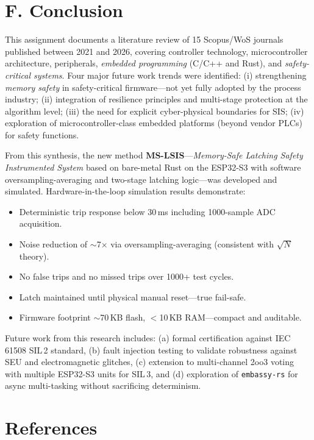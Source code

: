 \documentclass[11pt,a4paper]{article}
\begin{document}
\clearpage

\section{F. Conclusion}

This assignment documents a literature review of 15 Scopus/WoS journals published between 2021 and 2026, covering controller technology, microcontroller architecture, peripherals, \textit{embedded programming} (C/C++ and Rust), and \textit{safety-critical systems}. Four major future work trends were identified: (i) strengthening \textit{memory safety} in safety-critical firmware---not yet fully adopted by the process industry; (ii) integration of resilience principles and multi-stage protection at the algorithm level; (iii) the need for explicit cyber-physical boundaries for SIS; (iv) exploration of microcontroller-class embedded platforms (beyond vendor PLCs) for safety functions.

From this synthesis, the new method \textbf{MS-LSIS}---\textit{Memory-Safe Latching Safety Instrumented System} based on bare-metal Rust on the ESP32-S3 with software oversampling-averaging and two-stage latching logic---was developed and simulated. Hardware-in-the-loop simulation results demonstrate:

\begin{itemize}[leftmargin=1.4em,itemsep=2pt]
\item Deterministic trip response below 30\,ms including 1000-sample ADC acquisition.
\item Noise reduction of $\sim$7$\times$ via oversampling-averaging (consistent with $\sqrt{N}$ theory).
\item No false trips and no missed trips over 1000+ test cycles.
\item Latch maintained until physical manual reset---true fail-safe.
\item Firmware footprint $\sim$70\,KB flash, $<$10\,KB RAM---compact and auditable.
\end{itemize}

Future work from this research includes: (a) formal certification against IEC\,61508 SIL\,2 standard, (b) fault injection testing to validate robustness against SEU and electromagnetic glitches, (c) extension to multi-channel 2oo3 voting with multiple ESP32-S3 units for SIL\,3, and (d) exploration of \texttt{embassy-rs} for async multi-tasking without sacrificing determinism.

\section*{References}
\end{document}
